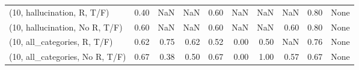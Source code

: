 \begin{table*}[h!]
\begin{adjustbox}{width=2\columnwidth,center}
\begin{tabular}{lrrr|rrr|rrr}
(10, hallucination, R, T/F)           &                      0.40 &                   NaN &                       NaN &                          0.60 &                       NaN &                           NaN &                                    NaN &                               0.80 &                                  None \\
(10, hallucination, No R, T/F)        &                      0.60 &                   NaN &                       NaN &                          0.60 &                       NaN &                           NaN &                                   0.60 &                               0.80 &                                  None \\
(10, all\_categories, R, T/F)          &                      0.62 &                  0.75 &                      0.62 &                          0.52 &                      0.00 &                          0.50 &                                    NaN &                               0.76 &                                  None \\
(10, all\_categories, No R, T/F)       &                      0.67 &                  0.38 &                      0.50 &                          0.67 &                      0.00 &                          1.00 &                                   0.57 &                               0.67 &                                  None \\




\end{tabular}
\end{adjustbox}
\end{table*}
